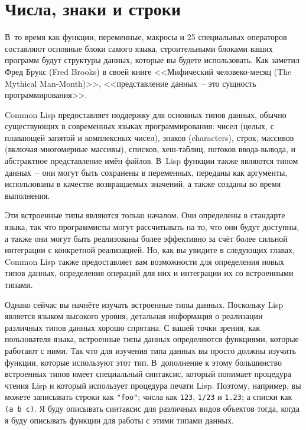 \chapter{Числа, знаки и строки}
\label{ch:10}

\thispagestyle{empty}

В~то время как функции, переменные, макросы и 25 специальных операторов составляют
основные блоки самого языка, строительными блоками ваших программ будут структуры данных,
которые вы будете использовать.  Как заметил Фред Брукс (Fred Brooks) в своей книге
<<Мифический человеко-месяц (The Mythical Man-Month)>>, <<представление данных~-- это
сущность программирования>>.

Common Lisp предоставляет поддержку для основных типов данных, обычно существующих в
современных языках программирования: чисел (целых, с плавающей запятой и комплексных
чисел), знаков (characters), строк, массивов
(включая многомерные массивы), списков, хеш-таблиц, потоков ввода-вывода, и абстрактное
представление имён файлов.  В~Lisp функции также являются типом данных~-- они могут быть
сохранены в переменных, переданы как аргументы, использованы в качестве возвращаемых
значений, а также созданы во время выполнения.

Эти встроенные типы являются только началом.  Они определены в стандарте языка, так что
программисты могут рассчитывать на то, что они будут доступны, а также они могут быть
реализованы более эффективно за счёт более сильной интеграции с конкретной реализацией.
Но, как вы увидите в следующих главах, Common Lisp также предоставляет вам возможности для
определения новых типов данных, определения операций для них и интеграции их со
встроенными типами.

Однако сейчас вы начнёте изучать встроенные типы данных.  Поскольку Lisp является языком
высокого уровня, детальная информация о реализации различных типов данных хорошо спрятана.
С вашей точки зрения, как пользователя языка, встроенные типы данных определяются
функциями, которые работают с ними.  Так что для изучения типа данных вы просто должны
изучить функции, которые используют этот тип.  В~дополнение к этому большинство
встроенных типов имеет специальный синтаксис, который понимает процедура чтения Lisp и
который использует процедура печати Lisp.  Поэтому, например, вы можете записывать строки
как \lstinline{"foo"}; числа как \lstinline{123}, \lstinline{1/23} и \lstinline{1.23}; а списки как 
\lstinline{(a b c)}.  Я буду описывать синтаксис для различных видов объектов тогда, когда я буду
описывать функции для работы с этими типами данных.

